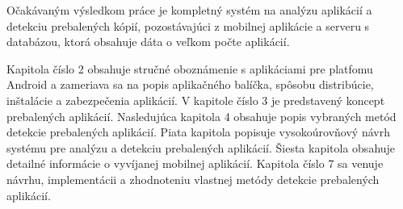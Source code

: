Očakávaným výsledkom práce je kompletný systém na analýzu aplikácií a detekciu prebalených kópií, pozostávajúci z mobilnej aplikácie a serveru s databázou, ktorá obsahuje dáta o veľkom počte aplikácií.

Kapitola číslo 2 obsahuje stručné oboznámenie s aplikáciami pre platfomu Android a zameriava sa na popis aplikačného balíčka, spôsobu distribúcie, inštalácie a zabezpečenia aplikácií. V kapitole číslo 3 je predstavený koncept prebalených aplikácií. Nasledujúca kapitola 4 obsahuje popis vybraných metód detekcie prebalených aplikácií. Piata kapitola popisuje vysokoúrovňový návrh systému pre analýzu a detekciu prebalených aplikácií. Šiesta kapitola obsahuje detailné informácie o vyvíjanej mobilnej aplikácií. Kapitola číslo 7 sa venuje návrhu, implementácii a zhodnoteniu vlastnej metódy detekcie prebalených aplikácií. 
